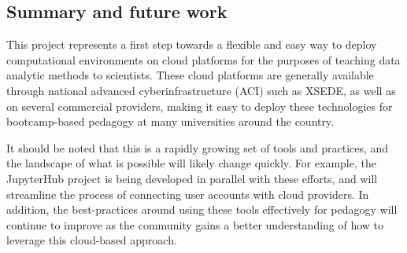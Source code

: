 \begin{enumerate}
\subsection{Summary and future work}

This project represents a first step towards a flexible and easy way to deploy
computational environments on cloud platforms for the purposes of teaching
data analytic methods to scientists. These cloud platforms are generally available
through national advanced cyberinfrastructure (ACI) such as XSEDE, as well as on several
commercial providers, making it easy to deploy these technologies for
bootcamp-based pedagogy at many universities around the country.

It should be noted that this is a rapidly growing set of tools and practices,
and the landscape of what is possible will likely change quickly. For example,
the JupyterHub project\cite{perez2015project} is being developed in parallel with
these efforts, and will streamline the process of connecting user
accounts with cloud providers. In addition, the best-practices around using
these tools effectively for pedagogy will continue to improve as the community
gains a better understanding of how to leverage this cloud-based approach.

\end{enumerate}
